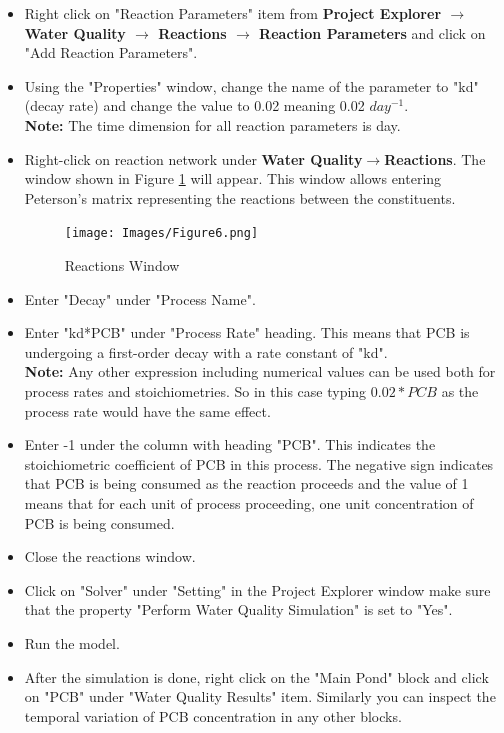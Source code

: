 \begin{itemize}
\item Right click on "Reaction Parameters" item from \textbf{Project Explorer $\rightarrow$ Water Quality $\rightarrow$ Reactions $\rightarrow$ Reaction Parameters} and click on "Add Reaction Parameters". 
\item Using the "Properties" window, change the name of the parameter to "kd" (decay rate) and change the value to 0.02 meaning 0.02 $day^{-1}$. \\
\textbf{Note: } The time dimension for all reaction parameters is day.\\
\item Right-click on reaction network under \textbf{Water Quality$\rightarrow$Reactions}. The window shown in Figure \ref{fig:6} will appear. This window allows entering Peterson's matrix representing the reactions between the constituents. 
\begin{figure}[!ht]\label{fig:6}
\begin{center}
\texttt{[image: Images/Figure6.png]} \\
\caption{Reactions Window} 
\end{center}
\end{figure}
\item Enter "Decay" under "Process Name".
\item Enter "kd*PCB" under "Process Rate" heading. This means that PCB is undergoing a first-order decay with a rate constant of "kd". \\
\textbf{Note: } Any other expression including numerical values can be used both for process rates and stoichiometries. So in this case typing $0.02*PCB$ as the process rate would have the same effect. \\
\item Enter -1 under the column with heading "PCB". This indicates the stoichiometric coefficient of PCB in this process. The negative sign indicates that PCB is being consumed as the reaction proceeds and the value of 1 means that for each unit of process proceeding, one unit concentration of PCB is being consumed. 
\item Close the reactions window. 
\item Click on "Solver" under "Setting" in the Project Explorer window make sure that the property "Perform Water Quality Simulation" is set to "Yes". 
\item Run the model. 
\item After the simulation is done, right click on the "Main Pond" block and click on "PCB" under "Water Quality Results" item. Similarly you can inspect the temporal variation of PCB concentration in any other blocks. 
\end{itemize}
